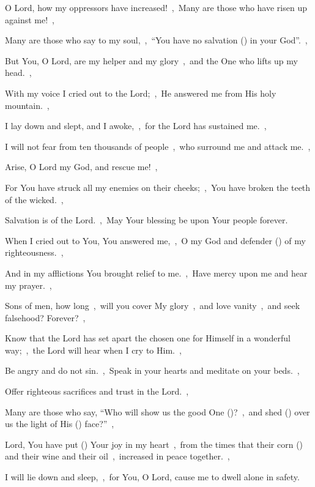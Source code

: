 \documentclass[12pt,twoside,a5paper]{article}
\begin{document}
\begin{normalparskip}
  O Lord, how my oppressors have increased!~\sep\ Many are those who have risen up against me!~\sep


  Many are those who say to my soul,~\sep\ ``You have no salvation () in your God''.~\sep

  But You, O Lord, are my helper and my glory~\sep\ and the One who lifts up my head.~\sep

  With my voice I cried out to the Lord;~\sep\ He answered me from His holy mountain.~\sep

  I lay down and slept, and I awoke,~\sep\ for the Lord has sustained me.~\sep

  I will not fear from ten thousands of people~\sep\ who surround me and attack me.~\sep

  Arise, O Lord my God, and rescue me!~\sep

  For You have struck all my enemies on their cheeks;~\sep\ You have broken the teeth of the wicked.~\sep

  Salvation is of the Lord.~\sep\ May Your blessing be upon Your people forever.
\end{normalparskip}


\begin{normalparskip}
  When I cried out to You, You answered me,~\sep\ O my God and defender () of my righteousness.~\sep


  And in my afflictions You brought relief to me.~\sep\ Have mercy upon me and hear my prayer.~\sep

  Sons of men, how long~\sep\ will you cover My glory~\sep\ and love vanity~\sep\ and seek falsehood? Forever?~\sep

  Know that the Lord has set apart the chosen one for Himself in a wonderful way;~\sep\ the Lord will hear when I cry to Him.~\sep

  Be angry and do not sin.~\sep\ Speak in your hearts and meditate on your beds.~\sep

  Offer righteous sacrifices and trust in the Lord.~\sep

  Many are those who say, ``Who will show us the good One ()?~\sep\ and shed () over us the light of His () face?''~\sep

  Lord, You have put () Your joy in my heart~\sep\ from the times that their corn () and their wine and their oil~\sep\ increased in peace together.~\sep

  I will lie down and sleep,~\sep\ for You, O Lord, cause me to dwell alone in safety.
\end{normalparskip}
\end{document}
